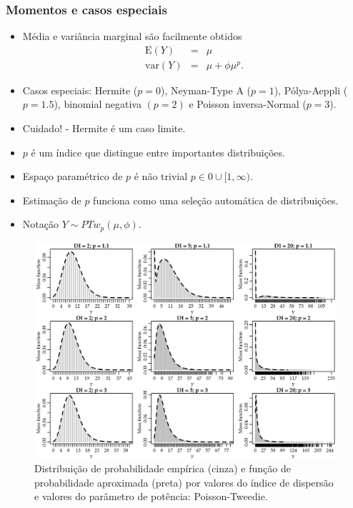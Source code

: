 \documentclass[10pt, aspectratio=169]{beamer}\usepackage[]{graphicx}\usepackage[]{color}
\begin{document}
\begin{frame}[c]
\frametitle{Momentos e casos especiais}
\begin{itemize}
\item Média e variância marginal são facilmente obtidos
\begin{eqnarray}
\label{marginalGaussian}
\mathrm{E}(Y) &=& \mu \nonumber    \\
\mathrm{var}(Y) &=& \mu + \phi\mu^p. \nonumber
\end{eqnarray}
\item Casos especiais: Hermite ($p=0$), Neyman-Type A ($p=1$), 
      P\'olya-Aeppli ($p=1.5$), binomial negativa $(p=2)$ e Poisson inversa-Normal ($p=3$).
\item Cuidado! - Hermite é um caso limite.
\item $p$ é um índice que distingue entre importantes distribuições.
\item Espaço paramétrico de $p$ é não trivial $p \in {0}\cup[1,\infty)$.
\item Estimação de $p$ funciona como uma seleção automática de distribuições.
\item Notação $Y \sim PTw_p(\mu, \phi)$.
\end{itemize}
\end{frame}

\begin{frame}[fragile]
\begin{figure}[h]
\includegraphics[scale=0.5]{images/PoissonTweedie.png}
\caption{Distribuição de probabilidade empírica (cinza) e função de 
probabilidade aproximada (preta) por valores do
índice de dispersão e valores do parâmetro de potência: Poisson-Tweedie.}
\label{Fig3}
\centering
\end{figure}
\end{frame}
\end{document}
